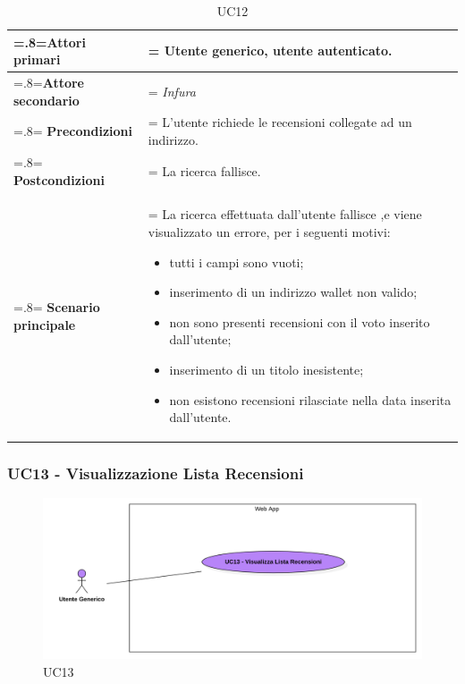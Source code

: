             \begin{table}[H]
                \centering
                \renewcommand{\arraystretch}{1.8}
                \renewcommand\tabularxcolumn[1]{m{#1}}
                \begin{tabularx}{0.9\textwidth} {
                    >{\hsize=.8\hsize\linewidth=\hsize}X
                    >{\hsize=1.2\hsize\linewidth=\hsize}X}
                    \hline
                    \textbf{Attori primari} & Utente generico, utente autenticato. \\
                    \hline
                    \textbf{Attore secondario} & \textit{Infura} \\
                    \hline
                    \textbf{Precondizioni} & L'utente richiede le recensioni collegate ad un indirizzo. \\
                    \hline
                    \textbf{Postcondizioni} & La ricerca fallisce. \\
                    \hline
                    \textbf{Scenario principale} & La ricerca effettuata dall'utente fallisce ,e viene visualizzato un errore, per i seguenti motivi:
                    \begin{itemize}
                        \item tutti i campi sono vuoti;
                        \item inserimento di un indirizzo wallet non valido;
                        \item non sono presenti recensioni con il voto inserito dall'utente;
                        \item inserimento di un titolo inesistente;
                        \item non esistono recensioni rilasciate nella data inserita dall'utente.
                    \end{itemize} \\
                    \hline
                \end{tabularx}
                \caption{UC12}
            \end{table}

        \subsubsection{UC13 - Visualizzazione Lista Recensioni}
        \label{UC13}

            \begin{figure}[H]
                \centering
                \includegraphics[scale=0.4]{src/img/UC13.png}
                \caption{UC13}
            \end{figure}

